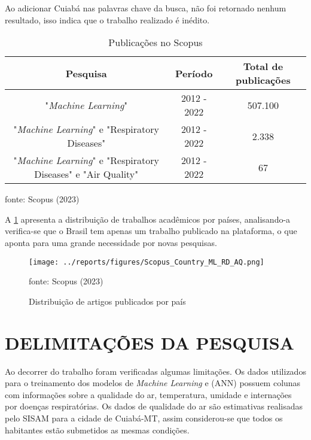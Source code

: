 \documentclass[
  12pt,		%
  a4paper,	%
  openright,%
  oneside,	%
  chapter=TITLE,		%
  section=TITLE,		%
  english,	%
  french,	%
  spanish,	%
  brazil	%
]{abntex2}
\begin{document}
    Ao adicionar Cuiabá nas palavras chave da busca, não foi retornado nenhum resultado, isso indica que o trabalho realizado é inédito.

    \begin{table}[ht]
        \centering
        \caption{Publicações no Scopus}
        \label{tabela scopus}
        \begin{tabular}{ccc}
            \hline
            \multicolumn{1}{|c|}{Pesquisa} & \multicolumn{1}{c|}{Período} & \multicolumn{1}{c|}{Total de publicações}\\
            \hline
            "\textit{Machine Learning}" & 2012 - 2022 & 507.100 \\
            "\textit{Machine Learning}" e "Respiratory Diseases" & 2012 - 2022 & 2.338 \\
            "\textit{Machine Learning}" e "Respiratory Diseases"  e "Air Quality" & 2012 - 2022 & 67 \\
            \hline
        \end{tabular}
        \par
        {\small fonte: Scopus (2023)}
    \end{table}

    A \ref*{scopus_country} apresenta a distribuição de trabalhos acadêmicos por países, analisando-a verifica-se que o Brasil tem apenas um trabalho publicado
    na plataforma, o que aponta para uma grande necessidade por novas pesquisas.

    \begin{figure}[ht]
        \centering
        \caption{Distribuição de artigos publicados por país}
        \texttt{[image: ../reports/figures/Scopus\_Country\_ML\_RD\_AQ.png]}
        \label{scopus_country}
        \par
        {\small fonte: Scopus (2023)}
    \end{figure}

    \section{DELIMITAÇÕES DA PESQUISA}
    Ao decorrer do trabalho foram verificadas algumas limitações.
    Os dados utilizados para o treinamento dos modelos de \textit{Machine Learning} e (ANN) possuem 
    colunas com informações sobre a qualidade do ar, temperatura, umidade e internações por doenças respiratórias. Os dados de qualidade
    do ar são estimativas realisadas pelo SISAM para a cidade de Cuiabá-MT, assim considerou-se que todos os habitantes 
    estão submetidos as mesmas condições.
\end{document}

